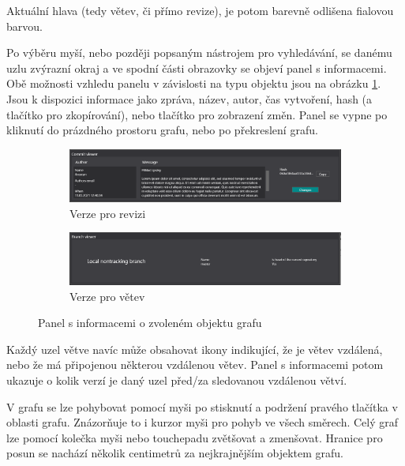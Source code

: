 \documentclass[
  biblatex,
  glossaries,
  index
]{kidiplom}
\begin{document}
Aktuální hlava (tedy větev, či přímo revize), je potom barevně odlišena fialovou barvou.

Po výběru myší, nebo později popsaným nástrojem pro vyhledávání, se danému uzlu zvýrazní okraj a ve spodní části obrazovky se objeví panel s informacemi. Obě možnosti vzhledu panelu v závislosti na typu objektu jsou na obrázku \ref{fig:item-info}. Jsou k dispozici informace jako zpráva, název, autor, čas vytvoření, hash (a tlačítko pro zkopírování), nebo tlačítko pro zobrazení změn. Panel se vypne po kliknutí do prázdného prostoru grafu, nebo po překreslení grafu.

\begin{figure}
\centering
\begin{subfigure}[b]{13cm}
   \includegraphics[width=1\linewidth]{commit-viewer.png}
   \caption{Verze pro revizi}

\vspace{5 mm}
\end{subfigure}
\begin{subfigure}[b]{13cm}
   \includegraphics[width=1\linewidth]{branch-viewer.png}
   \caption{Verze pro větev}
\end{subfigure}
\caption{Panel s informacemi o zvoleném objektu grafu}
\label{fig:item-info}
\end{figure}

Každý uzel větve navíc může obsahovat ikony indikující, že je větev vzdálená, nebo že má připojenou některou vzdálenou větev. Panel s informacemi potom ukazuje o kolik verzí je daný uzel před/za sledovanou vzdálenou větví.

V grafu se lze pohybovat pomocí myši po stisknutí a podržení pravého tlačítka v oblasti grafu. Znázorňuje to i kurzor myši pro pohyb ve všech směrech. Celý graf lze pomocí kolečka myši nebo touchepadu zvětšovat a zmenšovat. Hranice pro posun se nachází několik centimetrů za nejkrajnějším objektem grafu.
\end{document}
